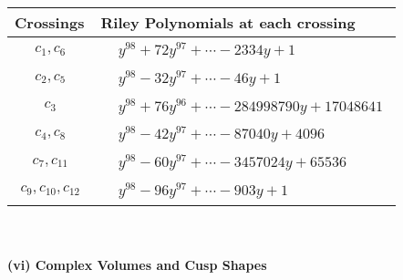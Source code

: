 \documentclass[1p]{elsarticle_modified}
\theoremstyle{definition}
\begin{document}
\begin{tabular}{m{50pt}|m{274pt}}
Crossings & \hspace{64pt}Riley Polynomials at each crossing \\
\hline $$\begin{aligned}c_{1},c_{6}\end{aligned}$$&$\begin{aligned}
&y^{98}+72 y^{97}+\cdots-2334 y+1
\end{aligned}$\\
\hline $$\begin{aligned}c_{2},c_{5}\end{aligned}$$&$\begin{aligned}
&y^{98}-32 y^{97}+\cdots-46 y+1
\end{aligned}$\\
\hline $$\begin{aligned}c_{3}\end{aligned}$$&$\begin{aligned}
&y^{98}+76 y^{96}+\cdots-284998790 y+17048641
\end{aligned}$\\
\hline $$\begin{aligned}c_{4},c_{8}\end{aligned}$$&$\begin{aligned}
&y^{98}-42 y^{97}+\cdots-87040 y+4096
\end{aligned}$\\
\hline $$\begin{aligned}c_{7},c_{11}\end{aligned}$$&$\begin{aligned}
&y^{98}-60 y^{97}+\cdots-3457024 y+65536
\end{aligned}$\\
\hline $$\begin{aligned}c_{9},c_{10},c_{12}\end{aligned}$$&$\begin{aligned}
&y^{98}-96 y^{97}+\cdots-903 y+1
\end{aligned}$\\
\hline
\end{tabular}\\~\\
\newpage\flushleft \textbf{(vi) Complex Volumes and Cusp Shapes}
\end{document}
